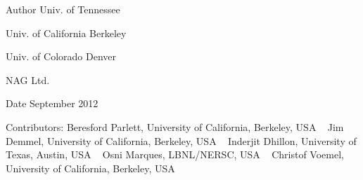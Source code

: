 \begin{DoxyAuthor}{Author}
Univ. of Tennessee 

Univ. of California Berkeley 

Univ. of Colorado Denver 

N\+A\+G Ltd. 
\end{DoxyAuthor}
\begin{DoxyDate}{Date}
September 2012 
\end{DoxyDate}
\begin{DoxyParagraph}{Contributors\+: }
Beresford Parlett, University of California, Berkeley, U\+S\+A ~\newline
 Jim Demmel, University of California, Berkeley, U\+S\+A ~\newline
 Inderjit Dhillon, University of Texas, Austin, U\+S\+A ~\newline
 Osni Marques, L\+B\+N\+L/\+N\+E\+R\+S\+C, U\+S\+A ~\newline
 Christof Voemel, University of California, Berkeley, U\+S\+A 
\end{DoxyParagraph}
\hypertarget{group__auxOTHERauxiliary_gaa9fa3671522ed0e21695769fd85982c7}{}
